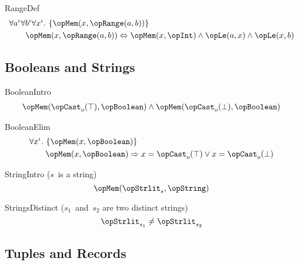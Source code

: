 \documentclass[11pt, a4paper, oneside]{article}
\begin{document}
\begin{axioms}
\item[RangeDef] \[
        \begin{aligned}
            &\forall a^\idv \forall b^\idv \forall x^\idv.\, \st{ \opMem(x, \opRange(a, b)) } \\
            &\qquad \opMem(x, \opRange(a, b)) \eqv \opMem(x, \opInt) \wedge \opLe(a, x) \wedge \opLe(x, b)
        \end{aligned}
    \]

\end{axioms}


    \subsection{Booleans and Strings}
    \label{subsec:bools_and_strings}

\begin{axioms}
\item[BooleanIntro] \[
        \begin{aligned}
            \opMem(\opCast_o(\top), \opBoolean) \wedge \opMem(\opCast_o(\bot), \opBoolean)
        \end{aligned}
    \]

\item[BooleanElim] \[
        \begin{aligned}
            &\forall x^\idv.\, \st{ \opMem(x, \opBoolean) } \\
            &\qquad \opMem(x, \opBoolean) \imp x = \opCast_o(\top) \vee x = \opCast_o(\bot)
        \end{aligned}
    \]

\item[StringIntro ({\rm$s$~is a string})] \[
        \opMem(\opStrlit_s, \opString)
    \]

\item[StringsDistinct ({\rm$s_1$~and~$s_2$ are two distinct strings})] \[
        \opStrlit_{s_1} \neq \opStrlit_{s_2}
    \]

\end{axioms}


    \subsection{Tuples and Records}
    \label{subsec:tups_and_recs}
\end{document}
